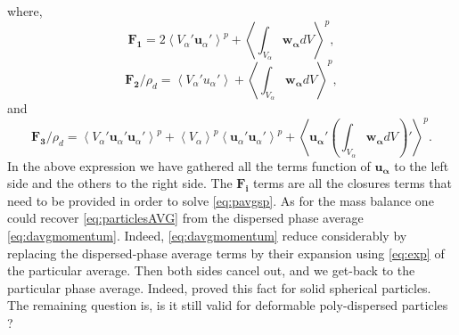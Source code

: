 where,
\begin{equation*}
    \bm{F_1}
    = 2\left<V_\alpha'\bm{u}_\alpha'\right>^p
    +  \left<\int_{V_\alpha} \bm{w_\alpha}dV\right>^p,
\end{equation*} 
\begin{equation*}
    \bm{F_2}/\rho_d
    = \left<V_\alpha' u_\alpha'\right> 
    +\left<\int_{V_\alpha} \bm{w_\alpha}dV\right>^p,
\end{equation*}
and
\begin{equation*}
    \bm{F_3}/\rho_d
    = \left<V_\alpha' \bm{u}_\alpha'\bm{u}_\alpha'\right>^p
    + \left<V_\alpha\right>^p \left<\bm{u}_\alpha'\bm{u}_\alpha'\right>^p
    +\left<\bm{u_\alpha}'\left(\int_{V_\alpha} \bm{w_\alpha}dV\right)'\right>^p.
\end{equation*}
In the above expression we have gathered all  the terms function of $\bm{u_\alpha}$ to the left side and the others to the right side. 
The $\bm{F_i}$ terms are all the closures terms that need to be provided in order to solve \ref{eq:pavgsp}. 
As for the mass balance one could recover  \ref{eq:particlesAVG} from the dispersed phase average \ref{eq:davgmomentum}.
Indeed, \ref{eq:davgmomentum} reduce considerably  by replacing the dispersed-phase average terms by their expansion using \ref{eq:exp} of the particular average. 
Then both sides cancel out, and we get-back to the particular phase average.
Indeed, \citep{nott2011suspension} proved this fact for solid spherical particles. 
The remaining question is, is it still valid for deformable poly-dispersed particles ? 



